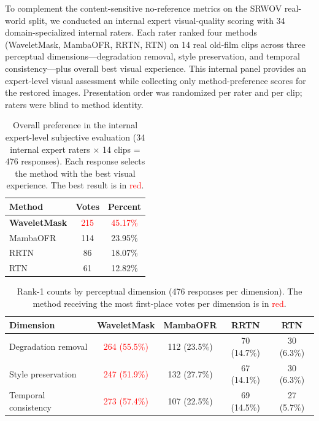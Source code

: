 \documentclass[10pt]{article}
\begin{document}
To complement the content-sensitive no-reference metrics on the SRWOV real-world split, we conducted an internal expert visual-quality scoring with 34 domain-specialized internal raters. Each rater ranked four methods (WaveletMask, MambaOFR, RRTN, RTN) on 14 real old-film clips across three perceptual dimensions---degradation removal, style preservation, and temporal consistency---plus overall best visual experience. This internal panel provides an expert-level visual assessment while collecting only method-preference scores for the restored images. Presentation order was randomized per rater and per clip; raters were blind to method identity.

\begin{table}[H]
\caption{Overall preference in the internal expert-level subjective evaluation (34 internal expert raters $\times$ 14 clips = 476 responses). Each response selects the method with the best visual experience. The best result is in \textcolor{red}{red}.\label{tab:s1}}
\begin{tabularx}{\textwidth}{lCC}
\toprule
\textbf{Method} & \textbf{Votes} & \textbf{Percent} \\
\midrule
\textbf{WaveletMask} & \textcolor{red}{215} & \textcolor{red}{45.17\%} \\
MambaOFR & 114 & 23.95\% \\
RRTN & 86 & 18.07\% \\
RTN & 61 & 12.82\% \\
\bottomrule
\end{tabularx}
\end{table}

\begin{table}[H]
\caption{Rank-1 counts by perceptual dimension (476 responses per dimension). The method receiving the most first-place votes per dimension is in \textcolor{red}{red}.\label{tab:s2}}
\begin{tabularx}{\textwidth}{lCCCC}
\toprule
\textbf{Dimension} & \textbf{WaveletMask} & \textbf{MambaOFR} & \textbf{RRTN} & \textbf{RTN} \\
\midrule
Degradation removal & \textcolor{red}{264 (55.5\%)} & 112 (23.5\%) & 70 (14.7\%) & 30 (6.3\%) \\
Style preservation & \textcolor{red}{247 (51.9\%)} & 132 (27.7\%) & 67 (14.1\%) & 30 (6.3\%) \\
Temporal consistency & \textcolor{red}{273 (57.4\%)} & 107 (22.5\%) & 69 (14.5\%) & 27 (5.7\%) \\
\bottomrule
\end{tabularx}
\end{table}
\end{document}
